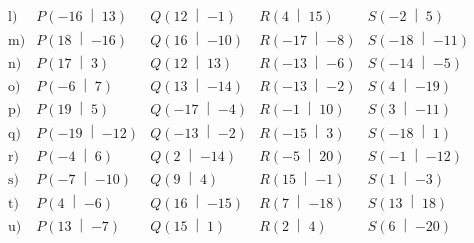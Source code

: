 \begin{equation*}
\begin{array}{lllll}
    \text{l)} & P\left(\num{-16}\;\middle|\;\num{13}\right) & Q\left(\num{12}\;\middle|\;\num{-1}\right) & R\left(\num{4}\;\middle|\;\num{15}\right) & S\left(\num{-2}\;\middle|\;\num{5}\right) \\[1ex]
    \text{m)} & P\left(\num{18}\;\middle|\;\num{-16}\right) & Q\left(\num{16}\;\middle|\;\num{-10}\right) & R\left(\num{-17}\;\middle|\;\num{-8}\right) & S\left(\num{-18}\;\middle|\;\num{-11}\right) \\[1ex]
    \text{n)} & P\left(\num{17}\;\middle|\;\num{3}\right) & Q\left(\num{12}\;\middle|\;\num{13}\right) & R\left(\num{-13}\;\middle|\;\num{-6}\right) & S\left(\num{-14}\;\middle|\;\num{-5}\right) \\[1ex]
    \text{o)} & P\left(\num{-6}\;\middle|\;\num{7}\right) & Q\left(\num{13}\;\middle|\;\num{-14}\right) & R\left(\num{-13}\;\middle|\;\num{-2}\right) & S\left(\num{4}\;\middle|\;\num{-19}\right) \\[1ex]
    \text{p)} & P\left(\num{19}\;\middle|\;\num{5}\right) & Q\left(\num{-17}\;\middle|\;\num{-4}\right) & R\left(\num{-1}\;\middle|\;\num{10}\right) & S\left(\num{3}\;\middle|\;\num{-11}\right) \\[1ex]
    \text{q)} & P\left(\num{-19}\;\middle|\;\num{-12}\right) & Q\left(\num{-13}\;\middle|\;\num{-2}\right) & R\left(\num{-15}\;\middle|\;\num{3}\right) & S\left(\num{-18}\;\middle|\;\num{1}\right) \\[1ex]
    \text{r)} & P\left(\num{-4}\;\middle|\;\num{6}\right) & Q\left(\num{2}\;\middle|\;\num{-14}\right) & R\left(\num{-5}\;\middle|\;\num{20}\right) & S\left(\num{-1}\;\middle|\;\num{-12}\right) \\[1ex]
    \text{s)} & P\left(\num{-7}\;\middle|\;\num{-10}\right) & Q\left(\num{9}\;\middle|\;\num{4}\right) & R\left(\num{15}\;\middle|\;\num{-1}\right) & S\left(\num{1}\;\middle|\;\num{-3}\right) \\[1ex]
    \text{t)} & P\left(\num{4}\;\middle|\;\num{-6}\right) & Q\left(\num{16}\;\middle|\;\num{-15}\right) & R\left(\num{7}\;\middle|\;\num{-18}\right) & S\left(\num{13}\;\middle|\;\num{18}\right) \\[1ex]
    \text{u)} & P\left(\num{13}\;\middle|\;\num{-7}\right) & Q\left(\num{15}\;\middle|\;\num{1}\right) & R\left(\num{2}\;\middle|\;\num{4}\right) & S\left(\num{6}\;\middle|\;\num{-20}\right)
  \end{array}
\end{equation*}
